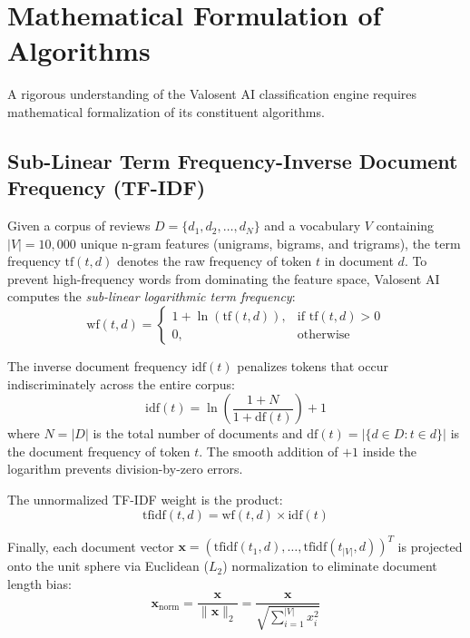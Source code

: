\section{Mathematical Formulation of Algorithms}
\label{sec:math_formulation}

A rigorous understanding of the Valosent AI classification engine requires mathematical formalization of its constituent algorithms.

\subsection{Sub-Linear Term Frequency-Inverse Document Frequency (TF-IDF)}
Given a corpus of reviews $D = \{d_1, d_2, \dots, d_N\}$ and a vocabulary $V$ containing $|V| = 10,000$ unique n-gram features (unigrams, bigrams, and trigrams), the term frequency $\text{tf}(t, d)$ denotes the raw frequency of token $t$ in document $d$. To prevent high-frequency words from dominating the feature space, Valosent AI computes the \textit{sub-linear logarithmic term frequency}:
\begin{equation}
    \text{wf}(t, d) = 
    \begin{cases} 
        1 + \ln(\text{tf}(t, d)), & \text{if } \text{tf}(t, d) > 0 \\ 
        0, & \text{otherwise} 
    \end{cases}
    \label{eq:sublinear_tf}
\end{equation}

The inverse document frequency $\text{idf}(t)$ penalizes tokens that occur indiscriminately across the entire corpus:
\begin{equation}
    \text{idf}(t) = \ln\left(\frac{1 + N}{1 + \text{df}(t)}\right) + 1
    \label{eq:idf}
\end{equation}
where $N = |D|$ is the total number of documents and $\text{df}(t) = |\{d \in D : t \in d\}|$ is the document frequency of token $t$. The smooth addition of $+1$ inside the logarithm prevents division-by-zero errors.

The unnormalized TF-IDF weight is the product:
\begin{equation}
    \text{tfidf}(t, d) = \text{wf}(t, d) \times \text{idf}(t)
\end{equation}

Finally, each document vector $\mathbf{x} = (\text{tfidf}(t_1, d), \dots, \text{tfidf}(t_{|V|}, d))^T$ is projected onto the unit sphere via Euclidean ($L_2$) normalization to eliminate document length bias:
\begin{equation}
    \mathbf{x}_{\text{norm}} = \frac{\mathbf{x}}{\|\mathbf{x}\|_2} = \frac{\mathbf{x}}{\sqrt{\sum_{i=1}^{|V|} x_i^2}}
    \label{eq:l2_norm}
\end{equation}

